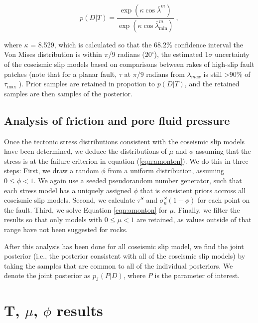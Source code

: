 \documentclass[twocolumn,jgrga]{AGUTeX}
\begin{document}
\begin{article}
\begin{equation}
p (D | T) = \frac{ \exp ( \kappa \cos \bar{\lambda}^m )} 
{\exp (\kappa \cos \bar{\lambda}^m_{\min})} \;,
\label{eqn:rel_likelihood}
\end{equation}

where $\kappa$ = 8.529, which is calculated so that the 68.2\%
confidence interval the Von Mises distribution is within $\pi$/9 radians
(20$^{\circ}$), the estimated 1$\sigma$ uncertainty of the coseismic
slip models based on comparisons between rakes of high-slip fault
patches (note that for a planar fault, $\tau$ at $\pi/9$ radians from
$\lambda_{max}$ is still \textgreater{}90\% of $\tau_{\mathrm{\max}}$
\citep{lisle2013}). Prior samples are retained in propotion to $p(D|T)$,
and the retained samples are then samples of the posterior.

\subsection{Analysis of friction and pore fluid
pressure}\label{analysis-of-friction-and-pore-fluid-pressure}

Once the tectonic stress distributions consistent with the coseismic
slip models have been determined, we deduce the distributions of $\mu$
and $\phi$ assuming that the stress is at the failure criterion in
equation (\ref{eqn:amonton}). We do this in three steps: First, we draw
a random $\phi$ from a uniform distribution, assuming $0 \leq \phi < 1$.
We again use a seeded pseudorandom number generator, such that each
stress model has a uniquely assigned $\phi$ that is consistent priors
accross all coseismic slip models. Second, we calculate $\tau^S$ and
$\sigma_n^S(1-\phi)$ for each point on the fault. Third, we solve
Equation \ref{eqn:amonton} for $\mu$. Finally, we filter the results so
that only models with $0 \le \mu < 1$ are retained, as values outside of
that range have not been suggested for rocks.

After this analysis has been done for all coseismic slip model, we find
the joint posterior (i.e., the posterior consistent with all of the
coseismic slip models) by taking the samples that are common to all of
the individual posteriors. We denote the joint posterior as
$p_{\mathrm{J}}(P | D)$, where $P$ is the parameter of interest.

\section{T, $\mu$, $\phi$ results}\label{t-mu-phi-results}


\end{article}
\end{document}
